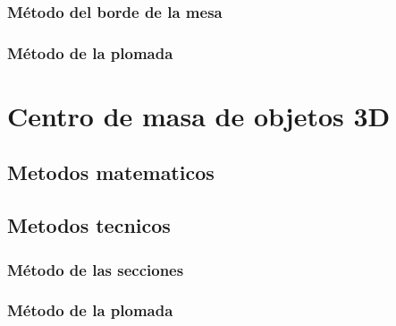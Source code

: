\documentclass[16pt,]{krantz}
\theoremstyle{definition}
\theoremstyle{definition}
\theoremstyle{definition}
\theoremstyle{definition}
\theoremstyle{remark}
\begin{document}
\hypertarget{muxe9todo-del-borde-de-la-mesa}{%
\subsubsection{Método del borde de la mesa}\label{muxe9todo-del-borde-de-la-mesa}}

\hypertarget{muxe9todo-de-la-plomada}{%
\subsubsection{Método de la plomada}\label{muxe9todo-de-la-plomada}}

\hypertarget{centro-de-masa-de-objetos-3d}{%
\section{Centro de masa de objetos 3D}\label{centro-de-masa-de-objetos-3d}}

\hypertarget{metodos-matematicos-1}{%
\subsection{Metodos matematicos}\label{metodos-matematicos-1}}

\hypertarget{metodos-tecnicos-1}{%
\subsection{Metodos tecnicos}\label{metodos-tecnicos-1}}

\hypertarget{muxe9todo-de-las-secciones}{%
\subsubsection{Método de las secciones}\label{muxe9todo-de-las-secciones}}

\hypertarget{muxe9todo-de-la-plomada-1}{%
\subsubsection{Método de la plomada}\label{muxe9todo-de-la-plomada-1}}



\printindex
\end{document}
